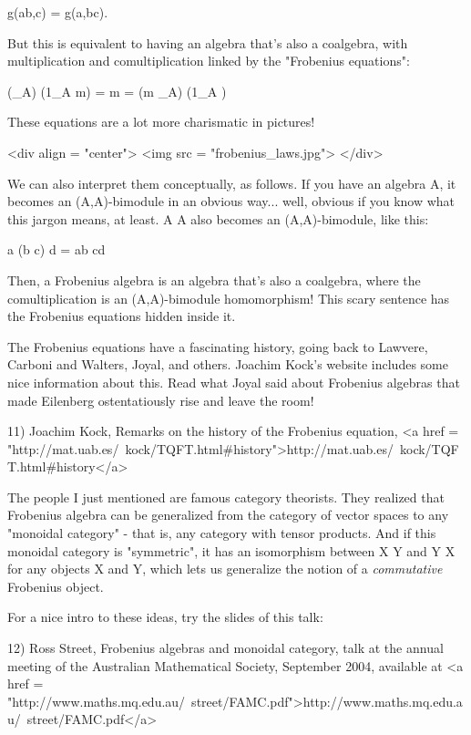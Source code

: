g(ab,c) = g(a,bc).  

But this is equivalent to having an algebra that's also a coalgebra,
with multiplication and comultiplication linked by the "Frobenius 
equations":

(\Delta  {}_{A}) (1_{A} \otimes  m) = \Delta  m =
(m _{A}) (1_{A} \otimes   \Delta ) 

These equations are a lot more charismatic in pictures!  

<div align = "center">
<img src = "frobenius_laws.jpg">
</div>

We can also 
interpret them conceptually, as follows.  If you have an algebra
A, it becomes an (A,A)-bimodule in an obvious way... well, obvious 
if you know what this jargon means, at least.   A \otimes  A also 
becomes an (A,A)-bimodule, like this:

a (b \otimes  c) d = ab \otimes  cd

Then, a Frobenius algebra is an algebra that's also a coalgebra,
where the comultiplication is an (A,A)-bimodule homomorphism!
This scary sentence has the Frobenius equations hidden inside it.

The Frobenius equations have a fascinating history, going back to 
Lawvere, Carboni and Walters, Joyal, and others.  Joachim Kock's 
website includes some nice information about this.  Read what Joyal 
said about Frobenius algebras that made Eilenberg ostentatiously 
rise and leave the room!

11) Joachim Kock, Remarks on the history of the Frobenius equation, 
<a href = "http://mat.uab.es/~kock/TQFT.html#history">http://mat.uab.es/~kock/TQFT.html#history</a>

The people I just mentioned are famous category theorists.  They
realized that Frobenius algebra can be generalized from the category
of vector spaces to any "monoidal category" - that is, any
category with tensor products.  And if this monoidal category is
"symmetric", it has an isomorphism between X \otimes  Y and Y
\otimes  X for any objects X and Y, which lets us generalize the notion
of a \emph{commutative} Frobenius object.

For a nice intro to these ideas, try the slides of this talk:

12) Ross Street, Frobenius algebras and monoidal category, talk at
the annual meeting of the Australian Mathematical Society, September
2004, available at <a href = "http://www.maths.mq.edu.au/~street/FAMC.pdf">http://www.maths.mq.edu.au/~street/FAMC.pdf</a>

